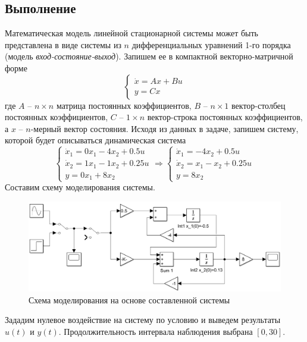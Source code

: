 \documentclass[a4paper, 12pt]{article}
\begin{document}
    \subsection{Выполнение}
    Математическая модель линейной стационарной системы может быть представлена в виде системы
    из $n$ дифференциальных уравнений 1-го порядка (модель \textit{вход-состояние-выход}).
    Запишем ее в компактной векторно-матричной форме
    $$
    \begin{cases}
        \dot{x}=Ax+Bu\\
        y=Cx
    \end{cases}
    $$
    где $A$ -- $n\times n$ матрица постоянных коэффициентов, $B$ -- $n\times1$ вектор-столбец постоянных
    коэффициентов, $C$ -- $1\times n$ вектор-строка постоянных коэффициентов, а $x$ -- $n$-мерный вектор состояния.
    Исходя из данных в задаче, запишем систему, которой будет описываться динамическая система
    $$
    \begin{cases}
    \dot{x}_1=0x_1-4x_2+0.5u\\
    \dot{x}_2=1x_1-1x_2+0.25u\\
    y=0x_1+8x_2
    \end{cases}
    \Rightarrow
    \begin{cases}
        \dot{x}_1=-4x_2+0.5u\\
        \dot{x}_2=x_1-x_2+0.25u\\
        y=8x_2
    \end{cases}
    $$
    Составим схему моделирования системы.
    \begin{figure}[H]
        \centering
        \includegraphics[scale=0.435]{scheme2.png}
        \captionsetup{skip=0pt}
        \caption{Схема моделирования на основе составленной системы}
        \label{fig:scheme2}
    \end{figure}
    Зададим нулевое воздействие на систему по условию и выведем результаты $u(t)$ и $y(t)$.
    Продолжительность интервала наблюдения выбрана $[0,30]$.
\end{document}
